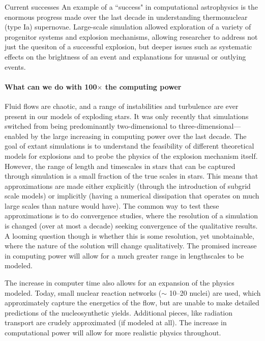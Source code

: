 \documentclass[11pt]{article}
\begin{document}
Current successes
An example of a ``success" in computational astrophysics is the
enormous progress made over the last decade in understanding 
thermonuclear (type Ia) supernovae. Large-scale simulation 
allowed exploration of a variety of progenitor systems and
explosion mechanisms, allowing researcher to address not
just the quesiton of a successful explosion, but deeper issues such
as systematic effects on the brightness of an event and explanations
for unusual or outlying events.

\paragraph*{What can we do with 100$\times$ the computing power}

Fluid flows are chaotic, and a range of instabilities and turbulence
are ever present in our models of exploding stars.  It was only
recently that simulations switched from being predominantly
two-dimensional to three-dimensional---enabled by the large increasing
in computing power over the last decade.  The goal of extant
simulations is to understand the feasibility of different theoretical
models for explosions and to probe the physics of the explosion
mechanism itself.  However, the range of length and timescales in
stars that can be captured through simulation is a small fraction of
the true scales in stars.  This means that approximations are made
either explicitly (through the introduction of subgrid scale models)
or implicitly (having a numerical dissipation that operates on much
large scales than nature would have).  The common way to test these
approximations is to do convergence studies, where the resolution of a
simulation is changed (over at most a decade) seeking convergence of
the qualitative results.  A looming question though is whether this is
some resolution, yet unobtainable, where the nature of the solution
will change qualitatively.  The promised increase in computing power
will allow for a much greater range in lengthscales to be modeled.

The increase in computer time also allows for an expansion of the
physics modeled.  Today, small nuclear reaction networks ($\sim$
10--20 nuclei) are used, which approximately capture the energetics of
the flow, but are unable to make detailed predictions of the
nucleosynthetic yields.  Additional pieces, like radiation transport
are crudely approximated (if modeled at all).  The increase in
computational power will allow for more realistic physics throughout.
\end{document}
